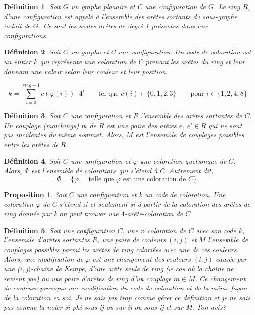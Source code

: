 \documentclass[10pt,a4paper]{article}
\newtheorem{definition}{Définition}
\newtheorem{proposition}{Proposition}
\begin{document}
\begin{definition}
Soit $G$ un graphe planaire et $C$ une configuration de $G$. Le \emph{ring}  $R$, d'une configuration est appelé à l'ensemble des arêtes sortants du sous-graphe induit de $G$. Ce sont les seules arêtes de degré 1 présentes dans une configurations.
\label{de:ring}
\end{definition}

\begin{definition}
Soit $G$ un graphe et $C$ une configuration. Un \emph{code} de coloration est un entier $k$ qui représente une coloration de $C$ prenant les arêtes du ring et leur donnant une valeur selon leur couleur et leur position.

$$
k = \sum_{i=0}^{ring-1} c(\varphi(i)) \cdot 4^{i} \qquad \textrm{tel que   } c(i) \in \lbrace 0,1,2,3 \rbrace \qquad \textrm{pour  } i \in \lbrace1,2,4,8 \rbrace
$$
\label{de:code}
\end{definition}

\begin{definition}
Soit $C$ une configuration et $R$ l'ensemble des arêtes sortantes de $C$. Un \emph{couplage} (matchings) $m$ de $R$ est une paire des arêtes $e$, $e' \in R$ qui ne sont pas incidentes du même sommet. Alors, $M$ est l'ensemble de \emph{couplages} possibles entre les arêtes de $R$.
\label{de:coup}
\end{definition}

\begin{definition}
Soit $C$ une configuration et $\varphi$ une coloration quelconque de $C$. Alors, $\Phi$ est l'ensemble de colorations qui s'étend à $C$. Autrement dit,
$$
\Phi = \lbrace \varphi, \quad \textrm{telle que $\varphi$ est une coloration de $C$} \rbrace.
$$
\label{de:phi}
\end{definition}

\begin{proposition}
Soit $C$ une configuration et $k$ un code de coloration. Une coloration $\varphi$ de $C$ \emph{s'étend} si et seulement si à partir de la coloration des arêtes de ring donnée par $k$ on peut trouver une $4$-arête-coloration de $C$
\label{pro:étend}
\end{proposition}

\begin{definition}
Soit une configuration $C$, une $\varphi$ coloration de $C$ avec son code $k$, l'ensemble d'arêtes sortantes $R$, une paire de couleurs $(i,j)$ et $M$ l'ensemble de couplages possibles parmi les arêtes de ring coloriées avec une de ces couleurs. Alors, une \emph{modification} de $\varphi$ est une changement des couleurs $(i,j)$ causée par une ($i,j)$-chaîne de Kempe, d'une arête seule de ring (le cas où la chaîne ne revient pas) ou une paire d'arêtes de ring  d'un couplage $m \in M$. Ce changement de couleurs provoque une modification du code de coloration et de la même façon de la coloration en soi.
{\color{red} Je ne sais pas trop comme gérer ce définition et je ne sais pas comme la noter si phi sous ij ou sur ij ou sous ij et sur M. Ton avis?}
\label{de:modif}
\end{definition}
\end{document}
